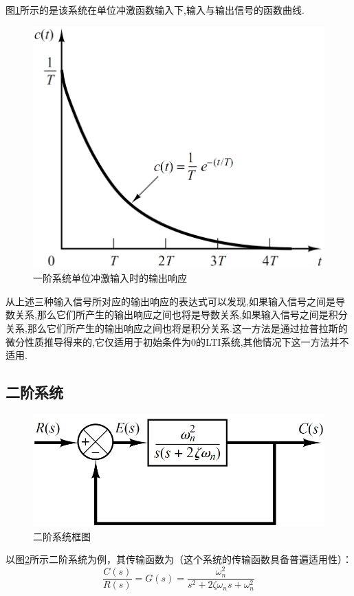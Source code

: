\documentclass{article}
\numberwithin{equation}{section}
\numberwithin{figure}{section}
\begin{document}
图\ref{1orderunitimpulseresponse}所示的是该系统在单位冲激函数输入下,输入与输出信号的函数曲线.
\begin{figure}
    \centering
    \includegraphics[width=.5\textwidth]{Chapter5/1orderunitumpulseresponse.png} %
    \caption{一阶系统单位冲激输入时的输出响应} %
    \label{1orderunitimpulseresponse} %
\end{figure}

从上述三种输入信号所对应的输出响应的表达式可以发现,如果输入信号之间是导数关系,那么它们所产生的输出响应之间也将是导数关系,如果输入信号之间是积分关系,那么它们所产生的输出响应之间也将是积分关系.这一方法是通过拉普拉斯的微分性质推导得来的,它仅适用于初始条件为0的LTI系统,其他情况下这一方法并不适用.


\subsection{二阶系统}
\begin{figure}
    \centering
    \includegraphics[width=.5\textwidth]{Chapter5/2ordersystem.png} %
    \caption{二阶系统框图} %
    \label{2ordersystem} %
\end{figure}

以图\ref{2ordersystem}所示二阶系统为例，其传输函数为（这个系统的传输函数具备普遍适用性）：
\begin{equation}
    \frac{C(s)}{R(s)}=G(s)=\frac{\omega _n^2}{s^2+2\zeta \omega _n s+\omega _n^2}
\end{equation}
\end{document}

